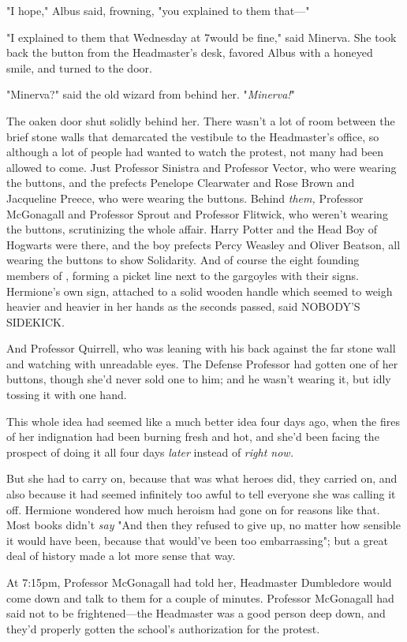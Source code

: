 "I hope," Albus said, frowning, "you explained to them that---"

"I explained to them that Wednesday at 7\PM would be fine," said Minerva. She
took back the button from the Headmaster's desk, favored Albus with a honeyed
smile, and turned to the door.

"Minerva?" said the old wizard from behind her. "\emph{Minerva!}"

The oaken door shut solidly behind her.
\later
There wasn't a lot of room between the brief stone walls that demarcated the
vestibule to the Headmaster's office, so although a lot of people had wanted to
watch the protest, not many had been allowed to come. Just Professor Sinistra
and Professor Vector, who were wearing the buttons, and the prefects Penelope
Clearwater and Rose Brown and Jacqueline Preece, who were wearing the buttons.
Behind \emph{them,} Professor McGonagall and Professor Sprout and Professor
Flitwick, who weren't wearing the buttons, scrutinizing the whole affair. Harry
Potter and the Head Boy of Hogwarts were there, and the boy prefects Percy
Weasley and Oliver Beatson, all wearing the buttons to show Solidarity. And of
course the eight founding members of \SPHEW, forming a picket line next to
the gargoyles with their signs. Hermione's own sign, attached to a solid wooden
handle which seemed to weigh heavier and heavier in her hands as the seconds
passed, said NOBODY'S SIDEKICK.

And Professor Quirrell, who was leaning with his back against the far stone
wall and watching with unreadable eyes. The Defense Professor had gotten one of
her buttons, though she'd never sold one to him; and he wasn't wearing it, but
idly tossing it with one hand.

This whole idea had seemed like a much better idea four days ago, when the
fires of her indignation had been burning fresh and hot, and she'd been facing
the prospect of doing it all four days \emph{later} instead of \emph{right now.}

But she had to carry on, because that was what heroes did, they carried on, and
also because it had seemed infinitely too awful to tell everyone she was
calling it off. Hermione wondered how much heroism had gone on for reasons like
that. Most books didn't \emph{say} "And then they refused to give up, no matter
how sensible it would have been, because that would've been too embarrassing";
but a great deal of history made a lot more sense that way.

At 7:15pm, Professor McGonagall had told her, Headmaster Dumbledore would come
down and talk to them for a couple of minutes. Professor McGonagall had said
not to be frightened---the Headmaster was a good person deep down, and they'd
properly gotten the school's authorization for the protest.

